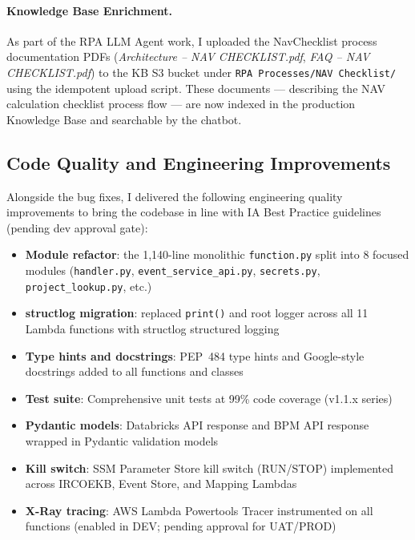 \paragraph{Knowledge Base Enrichment.}
As part of the RPA LLM Agent work, I uploaded the NavChecklist process documentation
PDFs (\textit{Architecture -- NAV CHECKLIST.pdf}, \textit{FAQ -- NAV
CHECKLIST.pdf}) to the KB S3 bucket under
\texttt{RPA Processes/NAV Checklist/} using the idempotent upload
script. These documents --- describing the NAV calculation checklist
process flow --- are now indexed in the production Knowledge Base and
searchable by the chatbot.

\subsection{Code Quality and Engineering Improvements}

Alongside the bug fixes, I delivered the following engineering quality
improvements to bring the codebase in line with IA Best Practice
guidelines (pending dev approval gate):

\begin{itemize}
    \item \textbf{Module refactor}: the 1,140-line monolithic
          \texttt{function.py} split into 8 focused modules
          (\texttt{handler.py}, \texttt{event\_service\_api.py},
          \texttt{secrets.py}, \texttt{project\_lookup.py}, etc.)
    \item \textbf{structlog migration}: replaced \texttt{print()} and
          root logger across all 11 Lambda functions with structlog
          structured logging
    \item \textbf{Type hints and docstrings}: PEP~484 type hints and
          Google-style docstrings added to all functions and classes
    \item \textbf{Test suite}: Comprehensive unit tests at 99\% code coverage
          (v1.1.x series)
    \item \textbf{Pydantic models}: Databricks API response and BPM
          API response wrapped in Pydantic validation models
    \item \textbf{Kill switch}: SSM Parameter Store kill switch
          (RUN/STOP) implemented across IRCOEKB, Event Store, and Mapping Lambdas
    \item \textbf{X-Ray tracing}: AWS Lambda Powertools Tracer
          instrumented on all functions (enabled in DEV; pending approval
          for UAT/PROD)
\end{itemize}

